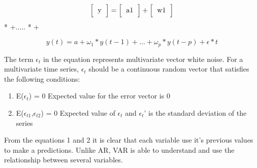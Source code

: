 \documentclass{article}
\begin{document}
\begin{center}
\[ 
 \Big[
  \begin{tabular}{c}
  y
  \end{tabular}
 \Big]
 =
 \Big[
  \begin{tabular}{c}
  a1
  \end{tabular}
 \Big]
 +
 \Big[
  \begin{tabular}{c}
  w1 
  \end{tabular}
 \Big]
\]
*
 \Big[
  \begin{tabular}{c}
  y1(t-1) 
  \end{tabular}
 \Big]
+.....
 \Big[
  \begin{tabular}{c}
  wp
  \end{tabular}
 \Big]
*
 \Big[
  \begin{tabular}{c}
  y1(t-p)
  \end{tabular}
 \Big]
+
 \Big[
  \begin{tabular}{c}
  e  
  \end{tabular}
 \Big]
\end{center}

\vspace{12 pt}
\[ y(t) = a + \omega_{1}*y(t-1)+...+\omega_{p}*y(t-p)+\epsilon*t \]

\vspace{12 pt}
The term $\epsilon_{t}$ in the equation represents multivariate vector white noise. For a multivariate time series, $\epsilon_{t}$ should be a continuous random vector that satisfies the following conditions:

\begin{enumerate}
    \item E($\epsilon_{t}$) = 0\newline
    Expected value for the error vector is 0
    \item E($\epsilon_{t1}$,$\epsilon_{t2}$) = 0\newline
    Expected value of $\epsilon_{t}$ and $\epsilon_{t}$' is the standard deviation of the series
\end{enumerate}

From the equations 1 and 2 it is clear that each variable use it's previous values to make a predictions. Unlike AR, VAR is able to understand and use the relationship between several variables.
\end{document}
